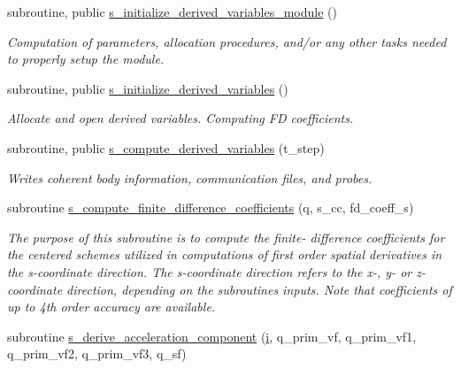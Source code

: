 \begin{DoxyCompactItemize}
\item 
subroutine, public \hyperlink{namespacem__derived__variables_a15a6d70e2bd1c9b7001c753ca1f2ee27}{s\+\_\+initialize\+\_\+derived\+\_\+variables\+\_\+module} ()
\begin{DoxyCompactList}\small\item\em Computation of parameters, allocation procedures, and/or any other tasks needed to properly setup the module. \end{DoxyCompactList}\item 
subroutine, public \hyperlink{namespacem__derived__variables_ae9dbea9bb47e84dbd380c480ad5144b8}{s\+\_\+initialize\+\_\+derived\+\_\+variables} ()
\begin{DoxyCompactList}\small\item\em Allocate and open derived variables. Computing FD coefficients. \end{DoxyCompactList}\item 
subroutine, public \hyperlink{namespacem__derived__variables_a516a9808b3446b7b45029f6451d02b3f}{s\+\_\+compute\+\_\+derived\+\_\+variables} (t\+\_\+step)
\begin{DoxyCompactList}\small\item\em Writes coherent body information, communication files, and probes. \end{DoxyCompactList}\item 
subroutine \hyperlink{namespacem__derived__variables_a908281ae7fe786ef19397e268ede0ece}{s\+\_\+compute\+\_\+finite\+\_\+difference\+\_\+coefficients} (q, s\+\_\+cc, fd\+\_\+coeff\+\_\+s)
\begin{DoxyCompactList}\small\item\em The purpose of this subroutine is to compute the finite-\/ difference coefficients for the centered schemes utilized in computations of first order spatial derivatives in the s-\/coordinate direction. The s-\/coordinate direction refers to the x-\/, y-\/ or z-\/coordinate direction, depending on the subroutine\textquotesingle{}s inputs. Note that coefficients of up to 4th order accuracy are available. \end{DoxyCompactList}\item 
subroutine \hyperlink{namespacem__derived__variables_a5c6df8a69a463ae2c56fb2c2bb8c59a7}{s\+\_\+derive\+\_\+acceleration\+\_\+component} (\hyperlink{m__rhs_8f90_aaea4baed8fd8b780f6938f0dc1fb0f72}{i}, q\+\_\+prim\+\_\+vf, q\+\_\+prim\+\_\+vf1, q\+\_\+prim\+\_\+vf2, q\+\_\+prim\+\_\+vf3, q\+\_\+sf)

\end{DoxyCompactItemize}
